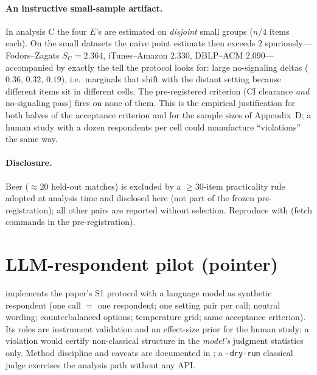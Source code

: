 \documentclass[11pt]{article}
\theoremstyle{definition}
\begin{document}
\paragraph{An instructive small-sample artifact.} In analysis C the four $E$'s are estimated on \emph{disjoint} small groups ($n/4$ items each). On the small datasets the naive point estimate then exceeds $2$ spuriously---Fodors--Zagats $S_{\text{C}}=2.364$, iTunes--Amazon $2.330$, DBLP--ACM $2.090$---accompanied by exactly the tell the protocol looks for: large no-signaling deltas ($0.36$, $0.32$, $0.19$), i.e.\ marginals that shift with the distant setting because different items sit in different cells. The pre-registered criterion (CI clearance \emph{and} no-signaling pass) fires on none of them. This is the empirical justification for both halves of the acceptance criterion and for the sample sizes of Appendix~D; a human study with a dozen respondents per cell could manufacture ``violations'' the same way.

\paragraph{Disclosure.} Beer ($\approx20$ held-out matches) is excluded by a $\ge30$-item practicality rule adopted at analysis time and disclosed here (not part of the frozen pre-registration); all other pairs are reported without selection. Reproduce with  (fetch commands in the pre-registration).

\section{LLM-respondent pilot (pointer)}
 implements the paper's S1 protocol with a language model as synthetic respondent (one call $=$ one respondent; one setting pair per call; neutral wording; counterbalanced options; temperature grid; same acceptance criterion). Its roles are instrument validation and an effect-size prior for the human study; a violation would certify non-classical structure in the \emph{model's} judgment statistics only. Method discipline and caveats are documented in ; a \texttt{--dry-run} classical judge exercises the analysis path without any API.
\end{document}
